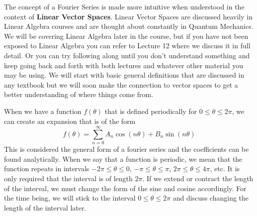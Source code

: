 \documentclass{article}
\newcommand{\be}{\begin{equation}}
\newcommand{\ee}{\end{equation}}
\begin{document}
The concept of a Fourier Series is made more intuitive when understood in the context of \textbf{Linear Vector Spaces}.
Linear Vector Spaces are discussed heavily in Linear Algebra courses and are thought about constantly in Quantum Mechanics.
We will be covering Linear Algebra later in the course, but if you have not been exposed to Linear Algebra you can refer to Lecture 12 where we discuss it in full detail.
Or you can try following along until you don't understand something and keep going back and forth with both lectures and whatever other material you may be using.
We will start with basic general definitions that are discussed in any textbook but we will soon make the connection to vector spaces to get a better understanding of where things come from.

When we have a function $f(\theta)$ that is defined periodically for $0 \leq \theta \leq 2 \pi$, we can create an expansion that is of the form
\be
  f(\theta) = \sum_{n = 0}^{\infty} A_n \cos(n \theta) + B_n \sin(n \theta)
\ee
This is considered the general form of a fourier series and the coefficients can be found analytically.
When we say that a function is periodic, we mean that the function repeats in intervals $- 2\pi \leq \theta \leq 0$, $- \pi \leq \theta \leq \pi$, $2 \pi \leq \theta \leq 4 \pi $, etc.
It is only required that the interval is of length $2\pi$.
If we extend or contract the length of the interval, we must change the form of the sine and cosine accordingly.
For the time being, we will stick to the interval $0 \leq \theta \leq 2 \pi$ and discuss changing the length of the interval later.
\end{document}
